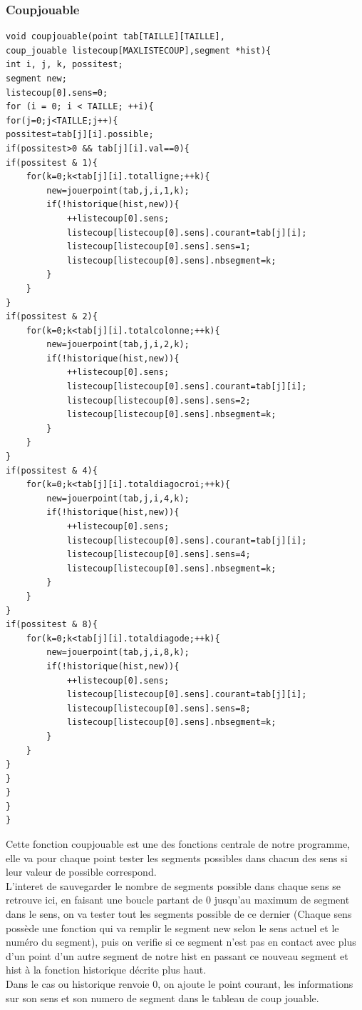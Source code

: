 \documentclass[11pt]{article}
\begin{document}
\subsubsection{Coupjouable}
\begin{lstlisting}
void coupjouable(point tab[TAILLE][TAILLE],
coup_jouable listecoup[MAXLISTECOUP],segment *hist){
int i, j, k, possitest;
segment new;
listecoup[0].sens=0;
for (i = 0; i < TAILLE; ++i){
for(j=0;j<TAILLE;j++){
possitest=tab[j][i].possible;
if(possitest>0 && tab[j][i].val==0){
if(possitest & 1){
	for(k=0;k<tab[j][i].totalligne;++k){
		new=jouerpoint(tab,j,i,1,k);
		if(!historique(hist,new)){
			++listecoup[0].sens;
			listecoup[listecoup[0].sens].courant=tab[j][i];
			listecoup[listecoup[0].sens].sens=1;
			listecoup[listecoup[0].sens].nbsegment=k;
		}
	}
}
if(possitest & 2){
	for(k=0;k<tab[j][i].totalcolonne;++k){
		new=jouerpoint(tab,j,i,2,k);
		if(!historique(hist,new)){
			++listecoup[0].sens;
			listecoup[listecoup[0].sens].courant=tab[j][i];
			listecoup[listecoup[0].sens].sens=2;
			listecoup[listecoup[0].sens].nbsegment=k;
		}
	}
}
if(possitest & 4){
	for(k=0;k<tab[j][i].totaldiagocroi;++k){
		new=jouerpoint(tab,j,i,4,k);
		if(!historique(hist,new)){
			++listecoup[0].sens;
			listecoup[listecoup[0].sens].courant=tab[j][i];
			listecoup[listecoup[0].sens].sens=4;
			listecoup[listecoup[0].sens].nbsegment=k;
		}
	}
}
if(possitest & 8){
	for(k=0;k<tab[j][i].totaldiagode;++k){
		new=jouerpoint(tab,j,i,8,k);
		if(!historique(hist,new)){
			++listecoup[0].sens;
			listecoup[listecoup[0].sens].courant=tab[j][i];
			listecoup[listecoup[0].sens].sens=8;
			listecoup[listecoup[0].sens].nbsegment=k;
		}
	}
}
}
}
}
}

\end{lstlisting}
Cette fonction coupjouable est une des fonctions centrale de notre programme, elle va pour chaque point tester les segments possibles dans chacun des sens si leur valeur de possible correspond.\\L'interet de sauvegarder le nombre de segments possible dans chaque sens se retrouve ici, en faisant une boucle partant de 0 jusqu'au maximum de segment dans le sens, on va tester tout les segments possible de ce dernier (Chaque sens possède une fonction qui va remplir le segment new selon le sens actuel et le numéro du segment), puis on verifie si ce segment n'est pas en contact avec plus d'un point d'un autre segment de notre hist en passant ce nouveau segment et hist à la fonction historique décrite plus haut.\\Dans le cas ou historique renvoie 0, on ajoute le point courant, les informations sur son sens et son numero de segment dans le tableau de coup jouable.\\
\\
\\
\\
\end{document}
